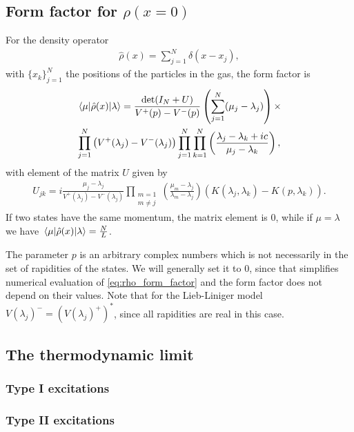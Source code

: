 \documentclass[11pt, a4paper]{report} %
\begin{document}
\subsection{Form factor for $\rho(x=0)$}
For the density operator
\begin{align}
  \hat{\rho}(x) = \sum_{j=1}^N \delta(x-x_j),
\end{align}
with \(\{x_k\}_{j=1}^N\) the positions of the particles in the gas, the form factor is~\cite{slavnov90_noneq_time_curren_correl_funct, Nardis2015}
\begin{multline}
  \label{eq:rho_form_factor}
  \matrixel{\mathbf{\mu}}{\hat{\rho}(x)}{\mathbf{\lambda}} = \frac{\det(I_N +U)}{V^+(p) - V^-(p)}
  \left(\sum_{j=1}^N(\mu_j-\lambda_j)\right) \times\\ \prod_{j=1}^N\left(V^+(\lambda_j) - V^-(\lambda_j)\right)\prod_{j=1}^N\prod_{k=1}^N\left(\frac{\lambda_j-\lambda_k+ic}{\mu_j-\lambda_k}\right),
\end{multline}
with element of the matrix \(U\) given by
\begin{align}
  U_{jk} = i \frac{\mu_j-\lambda_j}{V^+(\lambda_j) -V^-(\lambda_j)}\prod_{\substack{m=1\\m\neq j}} \left(\frac{\mu_m - \lambda_j}{\lambda_m-\lambda_j}\right) \left(K(\lambda_j, \lambda_k) - K(p, \lambda_k)\right).
\end{align}
If two states have the same momentum, the matrix element is 0, while if $\mu = \lambda$ we have $\matrixel{\mathbf{\mu}}{\hat{\rho}(x)}{\mathbf{\lambda}}=\frac{N}{L}$.

The parameter \(p\) is an arbitrary complex numbers which is not necessarily in the set of rapidities of the states.
We will generally set it to 0, since that simplifies numerical evaluation of \cref{eq:rho_form_factor} and the form factor does not depend on their values.
Note that for the Lieb-Liniger model \(V(\lambda_j)^{-} = (V(\lambda_j)^{+})^{*}\), since all rapidities are real in this case.

\subsection{The thermodynamic limit}

\subsubsection{Type I excitations}

\subsubsection{Type II excitations}
\end{document}
